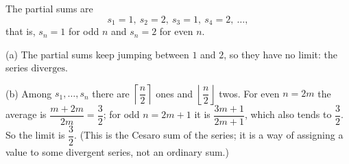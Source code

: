 The partial sums are
\[
s_1=1,\ s_2=2,\ s_3=1,\ s_4=2,\ \dots,
\]
that is, $s_n=1$ for odd $n$ and $s_n=2$ for even $n$.

(a) The partial sums keep jumping between $1$ and $2$, so they have no limit: the series $\boxed{\text{diverges}}$.

(b) Among $s_1,\dots,s_n$ there are $\left\lceil\dfrac {n}{2}\right\rceil$ ones and $\left\lfloor\dfrac {n}{2}\right\rfloor$ twos. For even $n=2m$ the average is $\dfrac{m+2m}{2m}=\dfrac{3}{2}$; for odd $n=2m+1$ it is $\dfrac{3m+1}{2m+1}$, which also tends to $\dfrac{3}{2}$. So the limit is $\boxed{\dfrac{3}{2}}$. (This is the Cesaro sum of the series; it is a way of assigning a value to some divergent series, not an ordinary sum.)
